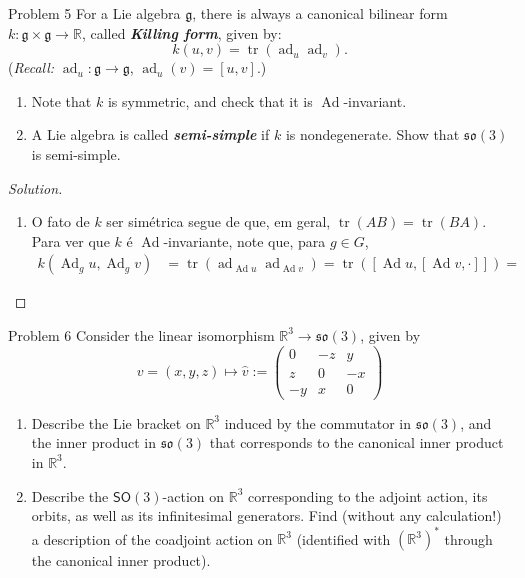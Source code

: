\begin{idea1}{Problem 5}\leavevmode
For a Lie algebra $\mathfrak{g}$, there is always a canonical bilinear form $k:\mathfrak{g} \times \mathfrak{g} \to \mathbb{R}$, called \textit{\textbf{Killing form}}, given by:
\[k(u,v)=\operatorname{tr}(\operatorname{ad}_u\operatorname{ad}_v).\]
(\textit{Recall:} $\operatorname{ad}_u:\mathfrak{g} \to \mathfrak{g}$, $\operatorname{ad}_u(v)=[u,v]$.)
\begin{enumerate}[label=\alph*.]
	\item Note that $k$ is symmetric, and check that it is  $\operatorname{Ad}$-invariant.
	\item A Lie algebra is called \textit{\textbf{semi-simple}} if $k$ is nondegenerate. Show that $\mathfrak{so}(3)$ is semi-simple.
\end{enumerate}
\end{idea1}

\begin{proof}[Solution]\leavevmode
	\begin{enumerate}[label=\alph*.]
		\item O fato de $k$ ser simétrica segue de que, em geral, $\operatorname{tr}(AB)=\operatorname{tr}(BA)$. Para ver que $k$ é $\operatorname{Ad}$-invariante, note que, para $g\in G$,
			\begin{align*}
				k(\operatorname{Ad}_gu,\operatorname{Ad}_gv)&=\operatorname{tr}(\operatorname{ad}_{\operatorname{Ad}u}\operatorname{ad}_{\operatorname{Ad}v})= \operatorname{tr}([\operatorname{Ad}u,[\operatorname{Ad}v,\cdot ]])=
			\end{align*}
	\end{enumerate}
\end{proof}

\begin{idea4}{Problem 6}\leavevmode
	Consider the linear isomorphism $\mathbb{R}^{3}\to \mathfrak{so}(3)$, given by
	\[v=(x,y,z)\longmapsto \hat{v}:=\begin{pmatrix} 0&-z&y\\z&0&-x\\-y&x&0 \end{pmatrix} \]
	\begin{enumerate}[label=\alph*.]
		\item Describe the Lie bracket on $\mathbb{R}^{3}$ induced by the commutator in $\mathfrak{so}(3)$, and the inner product in $\mathfrak{so}(3)$ that corresponds to the canonical inner product in $\mathbb{R}^{3}$.

		\item Describe the $\mathsf{SO}(3)$-action on $\mathbb{R}^{3}$ corresponding to the adjoint action, its orbits, as well as its infinitesimal generators. Find (without any calculation!) a description of the coadjoint action on $\mathbb{R}^{3}$ (identified with $(\mathbb{R}^{3})^*$ through the canonical inner product).
	\end{enumerate}
\end{idea4}

